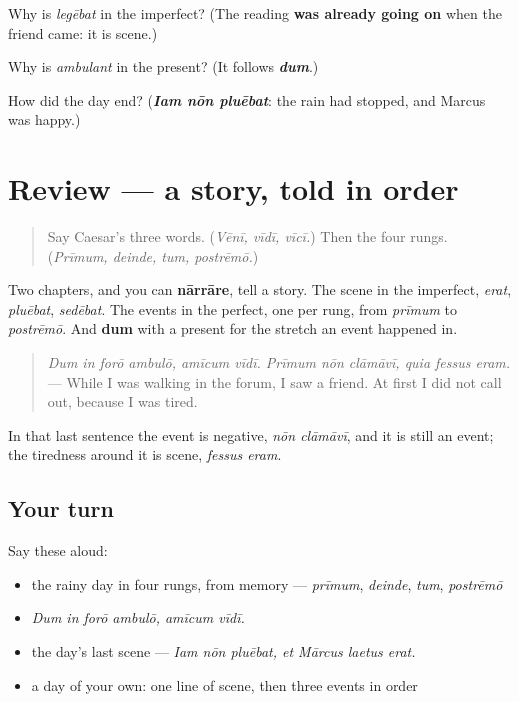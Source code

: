 \begin{tcolorbox}[breakable,colback=teal!4,colframe=teal!35!black,title={Before you move on}]
Why is \emph{legēbat} in the imperfect? (The reading \textbf{was already going on} when the friend came: it is scene.)

Why is \emph{ambulant} in the present? (It follows \emph{\textbf{dum}}.)

How did the day end? (\emph{\textbf{Iam nōn pluēbat}}: the rain had stopped, and Marcus was happy.)
\end{tcolorbox}
\section[(review)]{Review — a story, told in order}

\label{lesson:LA-R282-a-story-in-order}



\begin{quote}
Say Caesar's three words. (\emph{Vēnī, vīdī, vīcī.}) Then the four rungs. (\emph{Prīmum, deinde, tum, postrēmō.})
\end{quote}

\begin{grammarlens}[title={What you've built}]
Two chapters, and you can \textbf{nārrāre}, tell a story. The scene in the imperfect, \emph{erat}, \emph{pluēbat}, \emph{sedēbat}. The events in the perfect, one per rung, from \emph{prīmum} to \emph{postrēmō}. And \textbf{dum} with a present for the stretch an event happened in.

\begin{quote}
\emph{Dum in forō ambulō, amīcum vīdī. Prīmum nōn clāmāvī, quia fessus eram.} — While I was walking in the forum, I saw a friend. At first I did not call out, because I was tired.
\end{quote}

In that last sentence the event is negative, \emph{nōn clāmāvī}, and it is still an event; the tiredness around it is scene, \emph{fessus eram}.
\end{grammarlens}

\subsection*{Your turn}
Say these aloud:

\begin{itemize}
\raggedright
  \item the rainy day in four rungs, from memory — \emph{prīmum}, \emph{deinde}, \emph{tum}, \emph{postrēmō}
  \item \emph{Dum in forō ambulō, amīcum vīdī.}
  \item the day's last scene — \emph{Iam nōn pluēbat, et Mārcus laetus erat.}
  \item a day of your own: one line of scene, then three events in order
\end{itemize}

